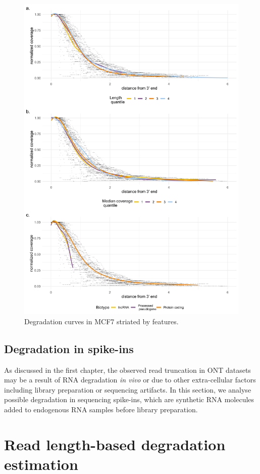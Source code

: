\begin{figure}[H]
    \centering
    \includegraphics[width=\textwidth]{figures/sec-2-by-feature.png}
    \caption[Degradation curves in MCF7 striated by features]{Degradation curves in MCF7 striated by features. }
    \label{fig:my_label}
\end{figure}

\subsection{Degradation in spike-ins}

As discussed in the first chapter, the observed read truncation in ONT datasets may be a result of RNA degradation \textit{in vivo} or due to other extra-cellular factors including library preparation or sequencing artifacts. In this section, we analyse possible degradation in sequencing spike-ins, which are synthetic RNA molecules added to endogenous RNA samples before library preparation.   

\section{Read length-based degradation estimation}\label{sec:rld}

